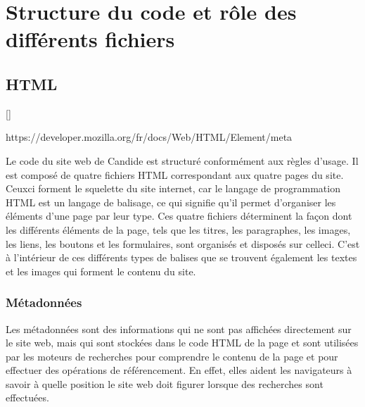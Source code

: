 \documentclass[a4,10pt,french]{sphinxmanual}
\begin{document}
\section{Structure du code et rôle des différents fichiers}
\label{\detokenize{chapitre-02:structure-du-code-et-role-des-differents-fichiers}}

\subsection{HTML}
\label{\detokenize{chapitre-02:html}}
\sphinxAtStartPar
{[}{]}
 \sphinxstepexplicit %
\begin{footnote}[4]\label{\thesphinxscope.4}%
\sphinxAtStartFootnote
https://developer.mozilla.org/fr/docs/Web/HTML/Element/meta
%
\end{footnote}

\sphinxAtStartPar
Le code du site web de Candide est structuré conformément aux règles d’usage. Il est composé de quatre fichiers HTML correspondant aux quatre pages du site. Ceux\sphinxhyphen{}ci forment le squelette du site internet, car le langage de programmation HTML est un langage de balisage, ce qui signifie qu’il permet d’organiser les éléments d’une page par leur type. Ces quatre fichiers déterminent la façon dont les différents éléments de la page, tels que les titres, les paragraphes, les images, les liens, les boutons et les formulaires, sont organisés et disposés sur celle\sphinxhyphen{}ci. C’est à l’intérieur de ces différents types de balises que se trouvent également les textes et les images qui forment le contenu du site.


\subsubsection{Métadonnées}
\label{\detokenize{chapitre-02:metadonnees}}
\sphinxAtStartPar
Les métadonnées sont des informations qui ne sont pas affichées directement sur le site web, mais qui sont stockées dans le code HTML de la page et sont utilisées par les moteurs de recherches pour comprendre le contenu de la page et pour effectuer des opérations de référencement. En effet, elles aident les navigateurs à savoir à quelle position le site web doit figurer lorsque des recherches sont effectuées.
\end{document}
